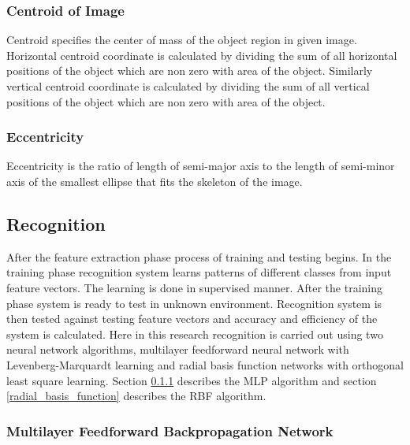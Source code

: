 \documentclass[12pt,a4paper,oneside]{article}
\numberwithin{equation}{section}
\numberwithin{algorithm}{section}
\begin{document}
\subsubsection{Centroid of Image}
\label{centroid}

Centroid specifies the center of mass of the object region in given image. Horizontal centroid coordinate is calculated by dividing the sum of all horizontal positions of the object which are non zero with area of the object. Similarly vertical centroid coordinate is calculated by dividing the sum of all vertical positions of the object which are non zero with area of the object.

\subsubsection{Eccentricity}
\label{eccentricity}
Eccentricity is the ratio of length of semi-major axis to the length of semi-minor axis of the smallest ellipse that fits the skeleton of the image.


\subsection{Recognition}
\label{recognition}
After the feature extraction phase process of training and testing begins. In the training phase recognition system learns patterns of different classes from input feature vectors. The learning is done in supervised manner. After the training phase system is ready to test in unknown environment. Recognition system is then tested against testing feature vectors and accuracy and efficiency of the system is calculated. Here in this research recognition is carried out using two neural network algorithms, multilayer feedforward neural network with Levenberg-Marquardt learning and radial basis function networks with orthogonal least square learning. Section \ref{multilayer_feedforward_network} describes the MLP algorithm and section \ref{radial_basis_function} describes the RBF algorithm.

\subsubsection{Multilayer Feedforward Backpropagation Network}
\label{multilayer_feedforward_network}
\end{document}
